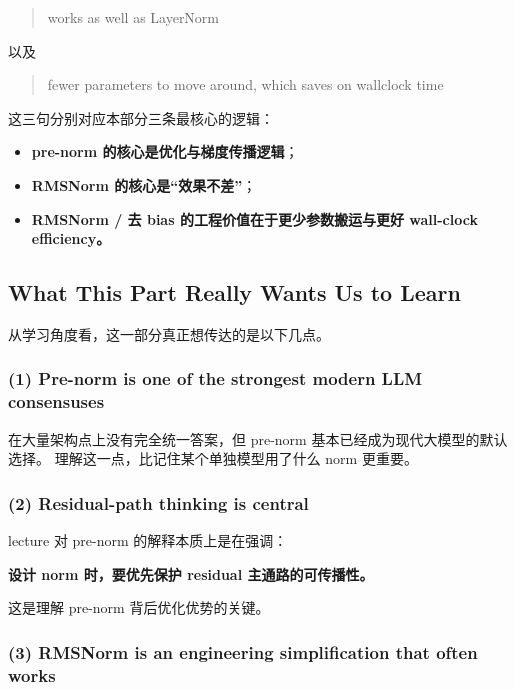 \documentclass[a4paper,UTF8]{article}
\numberwithin{equation}{section}
\begin{document}
\begin{quote}
works as well as LayerNorm
\end{quote}

以及

\begin{quote}
fewer parameters to move around, which saves on wallclock time
\end{quote}

这三句分别对应本部分三条最核心的逻辑：

\begin{itemize}
    \item \textbf{pre-norm 的核心是优化与梯度传播逻辑}；
    \item \textbf{RMSNorm 的核心是“效果不差”}；
    \item \textbf{RMSNorm / 去 bias 的工程价值在于更少参数搬运与更好 wall-clock efficiency。}
\end{itemize}

\subsection{What This Part Really Wants Us to Learn}

从学习角度看，这一部分真正想传达的是以下几点。

\subsubsection{(1) Pre-norm is one of the strongest modern LLM consensuses}

在大量架构点上没有完全统一答案，但 pre-norm 基本已经成为现代大模型的默认选择。  
理解这一点，比记住某个单独模型用了什么 norm 更重要。

\subsubsection{(2) Residual-path thinking is central}

lecture 对 pre-norm 的解释本质上是在强调：
\begin{center}
\textbf{设计 norm 时，要优先保护 residual 主通路的可传播性。}
\end{center}

这是理解 pre-norm 背后优化优势的关键。

\subsubsection{(3) RMSNorm is an engineering simplification that often works}
\end{document}
